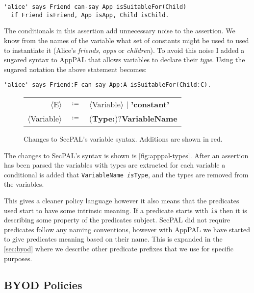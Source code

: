 \documentclass[a4paper]{scrartcl}
\newcommand{\new}[1]{{\color{BrickRed}#1}}
\begin{document}
\begin{lstlisting}
'alice' says Friend can-say App isSuitableFor(Child)
  if Friend isFriend, App isApp, Child isChild.
\end{lstlisting}

The conditionals in this assertion add unnecessary noise to the assertion. We
know from the names of the variable what set of constants might be used to used
to instantiate it (Alice's \emph{friends}, \emph{apps} or \emph{children}). To
avoid this noise I added a sugared syntax to AppPAL that allows variables to
declare their \emph{type}. Using the sugared notation the above statement
becomes:

\begin{lstlisting}
'alice' says Friend:F can-say App:A isSuitableFor(Child:C).
\end{lstlisting}

\begin{figure}
  \newcommand{\nonterminal}[1]{$\langle$#1$\rangle$}
  \newcommand{\terminal}[1]{\textbf{#1}}
  \begin{tabular}{r c l}
    \footnotesize
    \nonterminal{E}         & $\coloneqq$ & \nonterminal{Variable} $\vert$ \terminal{'constant'} \\
    \nonterminal{Variable}  & $\coloneqq$ & \new{(\terminal{Type}\terminal{:})?}\terminal{VariableName}
  \end{tabular}
  \caption{Changes to SecPAL's variable syntax.  Additions are shown in \new{red}.}
  \label{fig:apppal-types}
\end{figure}
The changes to SecPAL's syntax is shown is \autoref{fig:apppal-types}.
After an assertion has been parsed the variables with types are extracted for
each variable a conditional is added that \texttt{VariableName \emph{is}Type},
and the types are removed from the variables.

This gives a cleaner policy language however it also means that the predicates
used start to have some intrinsic meaning.  If a predicate starts with
\texttt{is} then it is describing some property of the predicates subject.
SecPAL did not require predicates follow any naming conventions, however with
AppPAL we have started to give predicates meaning based on their name.
This is expanded in the \autoref{sec:byod} where we describe other predicate
prefixes that we use for specific purposes.

\subsection{BYOD Policies}
\label{sec:byod}
\end{document}

